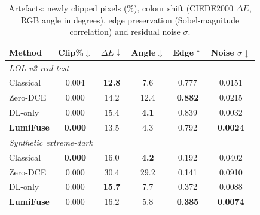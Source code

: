 \begin{table}[t]
\centering
\caption{Artefacts: newly clipped pixels (\%), colour shift (CIEDE2000 $\Delta E$, RGB angle in degrees), edge preservation (Sobel-magnitude correlation) and residual noise $\sigma$.}
\label{tab:artifacts}
\setlength{\tabcolsep}{3pt}
\footnotesize
\begin{tabular}{l ccccc}
\toprule
Method & Clip\%$\downarrow$ & $\Delta E\downarrow$ & Angle$\downarrow$ & Edge$\uparrow$ & Noise $\sigma\downarrow$ \\
\midrule
\multicolumn{6}{l}{\textit{LOL-v2-real test}}\\
Classical & 0.004 & \textbf{12.8} & 7.6 & 0.777 & 0.0151 \\
Zero-DCE & 0.000 & 14.2 & 12.4 & \textbf{0.882} & 0.0215 \\
DL-only & 0.000 & 15.4 & \textbf{4.1} & 0.839 & 0.0032 \\
\textbf{LumiFuse} & \textbf{0.000} & 13.5 & 4.3 & 0.792 & \textbf{0.0024} \\
\midrule
\multicolumn{6}{l}{\textit{Synthetic extreme-dark}}\\
Classical & \textbf{0.000} & 16.0 & \textbf{4.2} & 0.192 & 0.0402 \\
Zero-DCE & 0.000 & 30.4 & 29.2 & 0.141 & 0.0910 \\
DL-only & 0.000 & \textbf{15.7} & 7.7 & 0.372 & 0.0088 \\
\textbf{LumiFuse} & 0.000 & 16.2 & 5.8 & \textbf{0.385} & \textbf{0.0074} \\
\bottomrule
\end{tabular}
\end{table}
